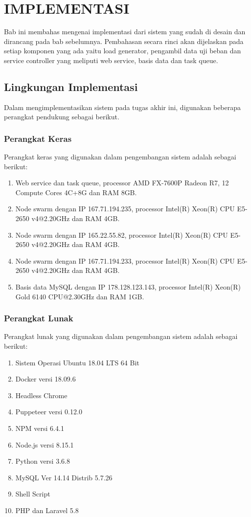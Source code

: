 \chapter{IMPLEMENTASI}
	Bab ini membahas mengenai implementasi dari sistem yang sudah di desain dan dirancang pada bab sebelumnya. Pembahasan secara rinci akan dijelaskan pada setiap komponen yang ada yaitu load generator, pengambil data uji beban dan service controller yang meliputi web service, basis data dan task queue.
	
	\section{Lingkungan Implementasi}
		Dalam mengimplementasikan sistem pada tugas akhir ini, digunakan beberapa perangkat pendukung sebagai berikut.
		
		\subsection{Perangkat Keras}
		Perangkat keras yang digunakan dalam pengembangan sistem adalah sebagai berikut:
		\begin{enumerate}
			\item Web service dan task queue, processor AMD FX-7600P Radeon R7, 12 Compute Cores 4C+8G dan RAM 8GB.
			\item Node swarm dengan IP 167.71.194.235, processor Intel(R) Xeon(R) CPU E5-2650 v4@2.20GHz dan RAM 4GB.
			\item Node swarm dengan IP 165.22.55.82, processor Intel(R) Xeon(R) CPU E5-2650 v4@2.20GHz dan RAM 4GB.
			\item Node swarm dengan IP 167.71.194.233, processor Intel(R) Xeon(R) CPU E5-2650 v4@2.20GHz dan RAM 4GB.
			\item Basis data MySQL dengan IP 178.128.123.143, processor Intel(R) Xeon(R) Gold 6140 CPU@2.30GHz dan RAM 1GB.
		\end{enumerate}
	
		\subsection{Perangkat Lunak}
		Perangkat lunak yang digunakan dalam pengembangan sistem adalah sebagai berikut:
		\begin{enumerate}
			\item Sistem Operasi Ubuntu 18.04 LTS 64 Bit
			\item Docker versi 18.09.6 
			\item Headless Chrome 
			\item Puppeteer versi 0.12.0
			\item NPM versi 6.4.1
			\item Node.js versi 8.15.1
			\item Python versi 3.6.8
			\item MySQL Ver 14.14 Distrib 5.7.26
			\item Shell Script
			\item PHP dan Laravel 5.8
		\end{enumerate}
		
